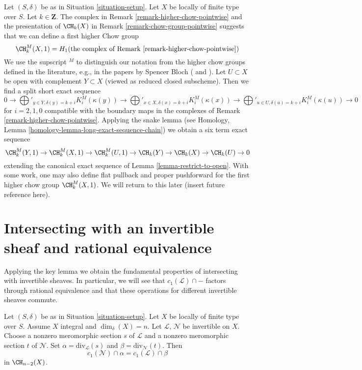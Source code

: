 \begin{remark}
\label{remark-higher-chow}
Let $(S, \delta)$ be as in Situation \ref{situation-setup}.
Let $X$ be locally of finite type over $S$. Let $k \in \mathbf{Z}$.
The complex in Remark \ref{remark-higher-chow-pointwise} and the
presentation of $\CH_k(X)$ in Remark \ref{remark-chow-group-pointwise}
suggests that we can define a first higher Chow group
$$
\CH^M_k(X, 1) =
H_1(\text{the complex of Remark \ref{remark-higher-chow-pointwise}})
$$
We use the supscript ${}^M$ to distinguish our notation from the
higher chow groups defined in the literature, e.g., in the papers
by Spencer Bloch (\cite{Bloch} and \cite{Bloch-moving}).
Let $U \subset X$ be open with complement $Y \subset X$ (viewed as reduced
closed subscheme). Then we find a split short exact sequence
$$
0 \to
\bigoplus'\nolimits_{y \in Y, \delta(y) = k + i} K_i^M(\kappa(y)) \to
\bigoplus'\nolimits_{x \in X, \delta(x) = k + i} K_i^M(\kappa(x)) \to
\bigoplus'\nolimits_{u \in U, \delta(u) = k + i} K_i^M(\kappa(u)) \to 0
$$
for $i = 2, 1, 0$ compatible with the boundary maps in the complexes
of Remark \ref{remark-higher-chow-pointwise}. Applying the snake lemma
(see Homology, Lemma \ref{homology-lemma-long-exact-sequence-chain})
we obtain a six term exact sequence
$$
\CH^M_k(Y, 1) \to \CH^M_k(X, 1) \to \CH^M_k(U, 1) \to
\CH_k(Y) \to \CH_k(X) \to \CH_k(U) \to 0
$$
extending the canonical exact sequence of Lemma \ref{lemma-restrict-to-open}.
With some work, one may also define flat pullback and proper pushforward
for the first higher chow group $\CH^M_k(X, 1)$. We will return to this
later (insert future reference here).
\end{remark}






\section{Intersecting with an invertible sheaf and rational equivalence}
\label{section-commutativity}

\noindent
Applying the key lemma we obtain the fundamental properties of intersecting
with invertible sheaves. In particular, we will see that
$c_1(\mathcal{L}) \cap -$ factors through rational equivalence and
that these operations for different invertible sheaves commute.

\begin{lemma}
\label{lemma-commutativity-on-integral}
Let $(S, \delta)$ be as in Situation \ref{situation-setup}.
Let $X$ be locally of finite type over $S$.
Assume $X$ integral and $\dim_\delta(X) = n$.
Let $\mathcal{L}$, $\mathcal{N}$ be invertible on $X$.
Choose a nonzero meromorphic section $s$ of $\mathcal{L}$
and a nonzero meromorphic section $t$ of $\mathcal{N}$.
Set $\alpha = \text{div}_\mathcal{L}(s)$ and
$\beta = \text{div}_\mathcal{N}(t)$.
Then
$$
c_1(\mathcal{N}) \cap \alpha
=
c_1(\mathcal{L}) \cap \beta
$$
in $\CH_{n - 2}(X)$.
\end{lemma}

